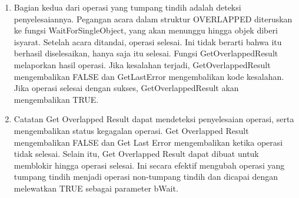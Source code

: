 				\begin{enumerate}
						\item Bagian kedua dari operasi yang tumpang tindih adalah deteksi penyelesaiannya. Pegangan acara dalam struktur OVERLAPPED diteruskan ke fungsi WaitForSingleObject, yang akan menunggu hingga objek diberi isyarat. Setelah acara ditandai, operasi selesai. Ini tidak berarti bahwa itu berhasil diselesaikan, hanya saja itu selesai. Fungsi GetOverlappedResult melaporkan hasil operasi. Jika kesalahan terjadi, GetOverlappedResult mengembalikan FALSE dan GetLastError mengembalikan kode kesalahan. Jika operasi selesai dengan sukses, GetOverlappedResult akan mengembalikan TRUE.

						
						\item Catatan Get Overlapped Result dapat mendeteksi penyelesaian operasi, serta mengembalikan status kegagalan operasi. Get Overlapped Result mengembalikan FALSE dan Get Last Error mengembalikan ketika operasi tidak selesai. Selain itu, Get Overlapped Result dapat dibuat untuk memblokir hingga operasi selesai. Ini secara efektif mengubah operasi yang tumpang tindih menjadi operasi non-tumpang tindih dan dicapai dengan melewatkan TRUE sebagai parameter bWait.
				\end{enumerate}


			
		
